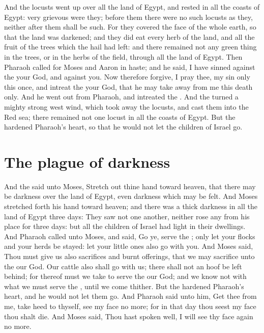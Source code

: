 \begin{biblechapter}
\verse And the locusts went up over all the land of Egypt, and rested in all the coasts of Egypt: very grievous were they; before them there were no such locusts as they, neither after them shall be such.
\verse For they covered the face of the whole earth, so that the land was darkened; and they did eat every herb of the land, and all the fruit of the trees which the hail had left: and there remained not any green thing in the trees, or in the herbs of the field, through all the land of Egypt.
\verse Then Pharaoh called for Moses and Aaron in haste; and he said, I have sinned against the \LORD your God, and against you.
\verse Now therefore forgive, I pray thee, my sin only this once, and intreat the \LORD your God, that he may take away from me this death only.
\verse And he went out from Pharaoh, and intreated the \LORD.
\verse And the \LORD turned a mighty strong west wind, which took away the locusts, and cast them into the Red sea; there remained not one locust in all the coasts of Egypt.
\verse But the \LORD hardened Pharaoh's heart, so that he would not let the children of Israel go.
\section*{The plague of darkness}
\verse And the \LORD said unto Moses, Stretch out thine hand toward heaven, that there may be darkness over the land of Egypt, even darkness which may be felt.
\verse And Moses stretched forth his hand toward heaven; and there was a thick darkness in all the land of Egypt three days:
\verse They saw not one another, neither rose any from his place for three days: but all the children of Israel had light in their dwellings.
\verse And Pharaoh called unto Moses, and said, Go ye, serve the \LORD; only let your flocks and your herds be stayed: let your little ones also go with you.
\verse And Moses said, Thou must give us also sacrifices and burnt offerings, that we may sacrifice unto the \LORD our God.
\verse Our cattle also shall go with us; there shall not an hoof be left behind; for thereof must we take to serve the \LORD our God; and we know not with what we must serve the \LORD, until we come thither.
\verse But the \LORD hardened Pharaoh's heart, and he would not let them go.
\verse And Pharaoh said unto him, Get thee from me, take heed to thyself, see my face no more; for in that day thou seest my face thou shalt die.
\verse And Moses said, Thou hast spoken well, I will see thy face again no more.
\end{biblechapter}

